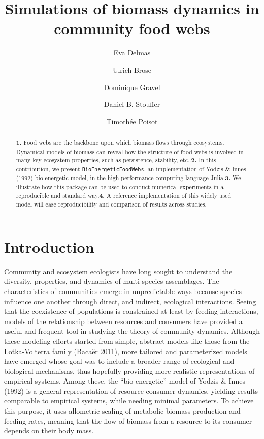 \documentclass[12pt]{article}
\title{Simulations of biomass dynamics in community food webs}
\author{
        Eva Delmas \and
        Ulrich Brose \and
        Dominique Gravel \and
        Daniel B. Stouffer \and
        Timothée Poisot \and
    }
\begin{document}
\maketitle

\clearpage
\doublespacing

\begin{abstract}
\textbf{1.} Food webs are the backbone upon which biomass flows through
ecosystems. Dynamical models of biomass can reveal how the structure of
food webs is involved in many key ecosystem properties, such as
persistence, stability, etc..\newline\textbf{2.} In this contribution,
we present \texttt{BioEnergeticFoodWebs}, an implementation of Yodzis \&
Innes (1992) bio-energetic model, in the high-performance computing
language Julia.\newline\textbf{3.} We illustrate how this package can be
used to conduct numerical experiments in a reproducible and standard
way.\newline\textbf{4.} A reference implementation of this widely used
model will ease reproducibility and comparison of results across
studies.
\end{abstract}

\clearpage
\doublespacing

\section{Introduction}\label{introduction}

Community and ecosystem ecologists have long sought to understand the
diversity, properties, and dynamics of multi-species assemblages. The
characteristics of communities emerge in unpredictable ways because
species influence one another through direct, and indirect, ecological
interactions. Seeing that the coexistence of populations is constrained
at least by feeding interactions, models of the relationship between
resources and consumers have provided a useful and frequent tool in
studying the theory of community dynamics. Although these modeling
efforts started from simple, abstract models like those from the
Lotka-Volterra family (Bacaër 2011), more tailored and parameterized
models have emerged whose goal was to include a broader range of
ecological and biological mechanisms, thus hopefully providing more
realistic representations of empirical systems. Among these, the
``bio-energetic'' model of Yodzis \& Innes (1992) is a general
representation of resource-consumer dynamics, yielding results
comparable to empirical systems, while needing minimal parameters. To
achieve this purpose, it uses allometric scaling of metabolic biomass
production and feeding rates, meaning that the flow of biomass from a
resource to its consumer depends on their body mass.
\end{document}

